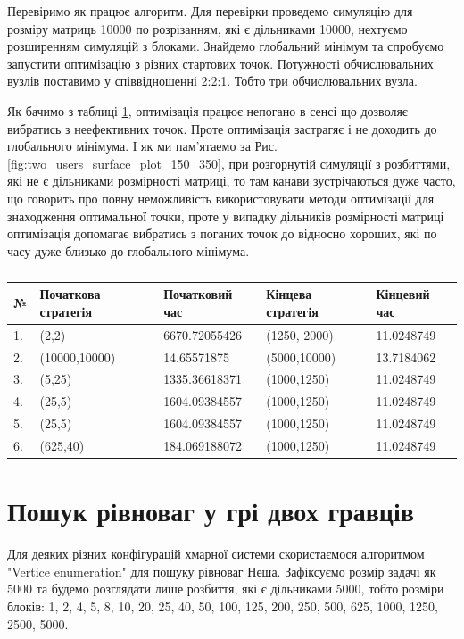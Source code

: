 Перевіримо як працює алгоритм. Для перевірки проведемо симуляцію для розміру матриць 10000 по розрізанням, які є дільниками 10000, нехтуємо розширенням симуляцій з блоками. Знайдемо глобальний мінімум та спробуємо запустити оптимізацію з різних стартових точок. Потужності обчислювальних вузлів поставимо у співвідношенні 2:2:1. Тобто три обчислювальних вузла.

Як бачимо з таблиці \ref{table:optimize_results}, оптимізація працює непогано в сенсі що дозволяє вибратись з неефективних точок. Проте оптимізація застрагяє і не доходить до глобального мінімума. І як ми пам'ятаемо за Рис. \ref{fig:two_users_surface_plot_150_350}, при розгорнутій симуляції з розбиттями, які не є дільниками розмірності матриці, то там канави зустрічаються дуже часто, що говорить про повну неможливість використовувати методи оптимізації для знаходження оптимальної точки, проте у випадку дільників розмірності матриці оптимізація допомагає вибратись з поганих точок до відносно хороших, які по часу дуже близько до глобального мінімума.

\begin{table}[H]
	\caption{}
	\label{table:optimize_results}
	\begin{tabular}{|l|l|l|l|l|}
		\hline
		№ & Початкова стратегія & Початковий час 	& Кінцева стратегія & Кінцевий час
		\\ \hline
		1.& (2,2)				& 6670.72055426     &  (1250, 2000) 	& 11.0248749
		\\ \hline
		2.& (10000,10000)		& 14.65571875   	&  (5000,10000)		& 13.7184062
		\\ \hline
		3.& (5,25)				& 1335.36618371		&  (1000,1250)		& 11.0248749
		\\ \hline
		4.& (25,5)				& 1604.09384557		&  (1000,1250)		& 11.0248749
		\\ \hline
		5.& (25,5)				& 1604.09384557		&  (1000,1250)		& 11.0248749
		\\ \hline
		6.& (625,40)			& 184.069188072		&  (1000,1250)		& 11.0248749
		\\ \hline
		
	\end{tabular}
\end{table}

\section{Пошук рівноваг у грі двох гравців}

Для деяких різних конфігурацій хмарної системи скористаємося алгоритмом "Vertice enumeration" для пошуку рівноваг Неша. Зафіксуємо розмір задачі як 5000 та будемо розглядати лише розбиття, які є дільниками 5000, тобто розміри блоків: 1, 2, 4, 5, 8, 10, 20, 25, 40, 50,  100, 125, 200, 250, 500, 625, 1000, 1250, 2500, 5000.

